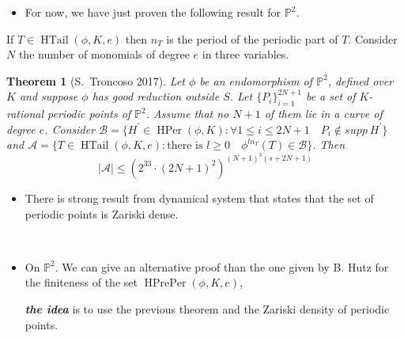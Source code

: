 \documentclass{beamer}
\def\jump{ \quad \\ \vspace{0.7cm} \pause}
\def\PP{{\mathbb P}}
\DeclareMathOperator{\HTail}{HTail}
\DeclareMathOperator{\HPer}{HPer}
\DeclareMathOperator{\HPrePer}{HPrePer}
\theoremstyle{thmstyle}
\theoremstyle{thmstyle}
\newtheorem*{mythm}{Theorem}
\theoremstyle{mystyle}
\theoremstyle{qstnstyle}
\begin{document}
\begin{frame}
\begin{itemize}
\item For now, we have just proven the following result for $\PP^2$.
\end{itemize}
\pause
If $T \in \HTail(\phi,K, e)$ then $n_T$ is the period of the periodic part of $T$. Consider $N$ the number of monomials of degree $e$ in three variables. \pause

\begin{mythm}[S.\ Troncoso 2017]
Let $\phi$ be an endomorphism of $\PP^2$, defined over $K$ and suppose $\phi$ has good reduction outside $S$. Let $\{P_i\}_{i=1}^{2N+1} $ be a set of $K$-rational periodic points of $\PP^2$. Assume that no $N+1$ of them lie in a curve of degree $e$. Consider $\mathcal{B} =\{ H^{\prime} \in \HPer(\phi,K) \colon \forall  1 \leq i \leq 2N+1 \quad P_i \notin  supp\ H^{\prime}     \} $ and $\mathcal{A}=\{ T \in \HTail(\phi,K, e) \colon \mbox{there is } l\geq 0 \quad \phi^{ln_T}(T) \in \mathcal{B}   \}$.  Then
 $$ |\mathcal{A} | \leq \left(2^{33} \cdot (2N+1)^2\right)^{\left(N+1\right)^3(s+2N+1)}  $$
\end{mythm}


\end{frame}

\begin{frame}
\begin{itemize}

\item  There is strong result from dynamical system that states that the set of periodic points is Zariski dense.

\jump 

\item On $\PP^2$. We can give an alternative proof than the one given by B. Hutz for the finiteness of the set $\HPrePer(\phi,K,e)$, 

\textbf{\emph{the idea}} is to use the previous theorem and the Zariski density of periodic points.
\end{itemize}
\end{frame}
\end{document}
